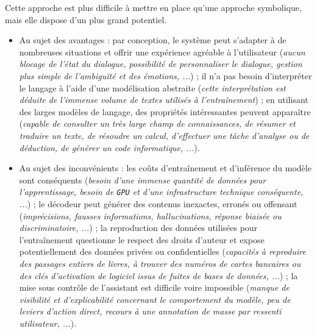 			
			Cette approche est plus difficile à mettre en place qu'une approche symbolique, mais elle dispose d'un plus grand potentiel.
			\begin{itemize}
				\item[\textcolor{colorDarkPastelGreen}{\textcolor{colorDarkPastelGreen}{\faThumbsUp}}] Au sujet des avantages :
					par conception, le système peut s'adapter à de nombreuses situations et offrir une expérience agréable à l'utilisateur
					(\textit{aucun blocage de l'état du dialogue, possibilité de personnaliser le dialogue, gestion plus simple de l'ambiguïté et des émotions, ...}) ;
					il n'a pas besoin d'interpréter le langage à l'aide d'une modélisation abstraite
					(\textit{cette interprétation est déduite de l'immense volume de textes utilisés à l’entraînement}) ;
					en utilisant des larges modèles de langage, des propriétés intéressantes peuvent apparaître
					(\textit{capable de consulter un très large champ de connaissances, de résumer et traduire un texte, de résoudre un calcul, d'effectuer une tâche d'analyse ou de déduction, de générer un code informatique, ...}).
				\item[\textcolor{colorDarkPastelRed}{\textcolor{colorDarkPastelRed}{\faThumbsDown}}] Au sujet des inconvénients :
					les coûts d'entraînement et d'inférence du modèle sont conséquents
					(\textit{besoin d'une immense quantité de données pour l'apprentissage, besoin de \texttt{GPU} et d'une infrastructure technique conséquente, ...}) ;
					le décodeur peut générer des contenus inexactes, erronés ou offensant
					(\textit{imprécisions, fausses informations, hallucinations, réponse biaisée ou discriminatoire, ...}) ;
					la reproduction des données utilisées pour l'entraînement questionne le respect des droits d'auteur et expose potentiellement des données privées ou confidentielles
					(\textit{capacités à reproduire des passages entiers de livres, à trouver des numéros de cartes bancaires ou des clés d'activation de logiciel issus de fuites de bases de données, ...}) ;
					la mise sous contrôle de l'assistant est difficile voire impossible
					(\textit{manque de visibilité et d'explicabilité concernant le comportement du modèle, peu de leviers d'action direct, recours à une annotation de masse par ressenti utilisateur, ...}).
			\end{itemize}
			

